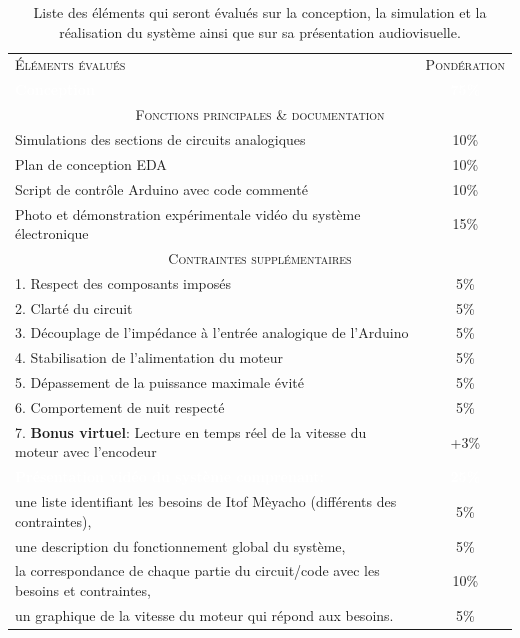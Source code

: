 \documentclass[english,french,12pt]{article}
\begin{document}
\renewcommand{\arraystretch}{1.5}
\begin{table}[h]
\centering
    \begin{tabular}{l c}
    \hline
     \textsc{Éléments évalués} & \textsc{Pondération}\\
     \rowcolor{black} \textcolor{white}{\textbf{Conception}} & \textcolor{white}{\textbf{75\%}}\\
     \multicolumn{2}{c}{\textsc{Fonctions principales \& documentation}}\\
     \hline
     Simulations des sections de circuits analogiques & 10\%\\
     Plan de conception EDA & 10\%\\
     Script de contrôle Arduino avec code commenté & 10\%\\
     Photo et démonstration expérimentale vidéo du système électronique & 15\%\\
     \hline
     \multicolumn{2}{c}{\textsc{Contraintes supplémentaires}}\\
     \hline
     1. Respect des composants imposés & 5\%\\
     2. Clarté du circuit & 5\%\\
     3. Découplage de l'impédance à l'entrée analogique de l'Arduino & 5\%\\
     4. Stabilisation de l'alimentation du moteur & 5\%\\
     5. Dépassement de la puissance maximale évité & 5\%\\
     6. Comportement de nuit respecté & 5\%\\
     7. \textbf{Bonus virtuel}: Lecture en temps réel de la vitesse du moteur avec l'encodeur & +3\%\\
     \rowcolor{black} \textcolor{white}{\textbf{Présentation vidéo du système comprenant:}} & \textcolor{white}{\textbf{25\%}}\\
     une liste identifiant les besoins de Itof Mèyacho (différents des contraintes), & 5\%\\
     une description du fonctionnement global du système, & 5\%\\
     la correspondance de chaque partie du circuit/code avec les besoins et contraintes, & 10\%\\
     un graphique de la vitesse du moteur qui répond aux besoins. & 5\%\\
     \hline
    \end{tabular}
\caption{Liste des éléments qui seront évalués sur la conception, la simulation et la réalisation du système ainsi que sur sa présentation audiovisuelle.}
\label{tab:1}
\end{table}
\end{document}
